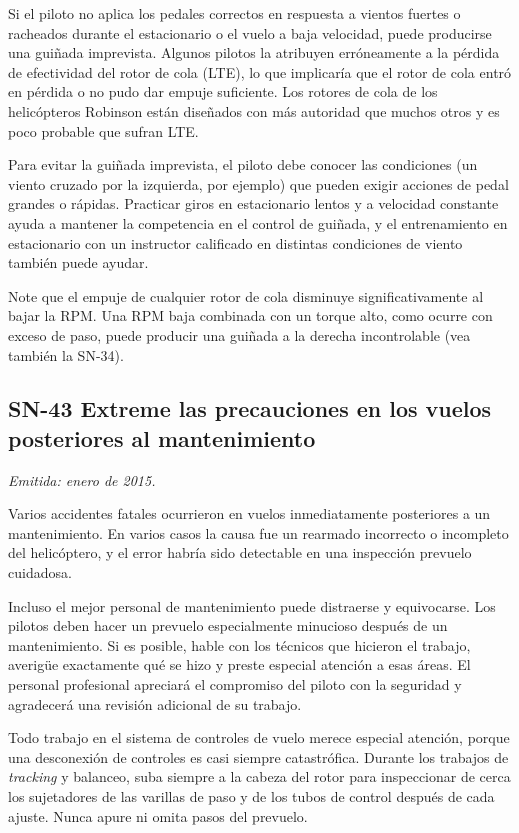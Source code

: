 Si el piloto no aplica los pedales correctos en respuesta a vientos fuertes o racheados durante el estacionario o el vuelo a baja velocidad, puede producirse una guiñada imprevista. Algunos pilotos la atribuyen erróneamente a la pérdida de efectividad del rotor de cola (LTE), lo que implicaría que el rotor de cola entró en pérdida o no pudo dar empuje suficiente. Los rotores de cola de los helicópteros Robinson están diseñados con más autoridad que muchos otros y es poco probable que sufran LTE.

Para evitar la guiñada imprevista, el piloto debe conocer las condiciones (un viento cruzado por la izquierda, por ejemplo) que pueden exigir acciones de pedal grandes o rápidas. Practicar giros en estacionario lentos y a velocidad constante ayuda a mantener la competencia en el control de guiñada, y el entrenamiento en estacionario con un instructor calificado en distintas condiciones de viento también puede ayudar.

Note que el empuje de cualquier rotor de cola disminuye significativamente al bajar la RPM. Una RPM baja combinada con un torque alto, como ocurre con exceso de paso, puede producir una guiñada a la derecha incontrolable (vea también la SN-34).

\subsection*{SN-43 \quad Extreme las precauciones en los vuelos posteriores al mantenimiento}
{\small\textit{Emitida: enero de 2015.}}

Varios accidentes fatales ocurrieron en vuelos inmediatamente posteriores a un mantenimiento. En varios casos la causa fue un rearmado incorrecto o incompleto del helicóptero, y el error habría sido detectable en una inspección prevuelo cuidadosa.

Incluso el mejor personal de mantenimiento puede distraerse y equivocarse. Los pilotos deben hacer un prevuelo especialmente minucioso después de un mantenimiento. Si es posible, hable con los técnicos que hicieron el trabajo, averigüe exactamente qué se hizo y preste especial atención a esas áreas. El personal profesional apreciará el compromiso del piloto con la seguridad y agradecerá una revisión adicional de su trabajo.

Todo trabajo en el sistema de controles de vuelo merece especial atención, porque una desconexión de controles es casi siempre catastrófica. Durante los trabajos de \emph{tracking} y balanceo, suba siempre a la cabeza del rotor para inspeccionar de cerca los sujetadores de las varillas de paso y de los tubos de control después de cada ajuste. Nunca apure ni omita pasos del prevuelo.

